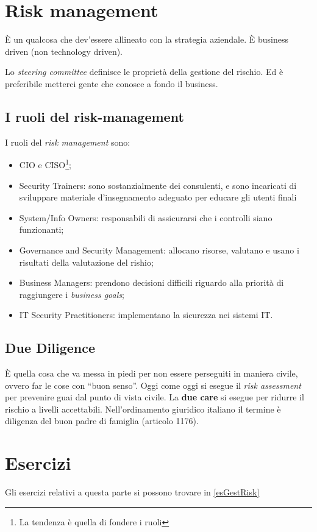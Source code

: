 \section{Risk management}

È un qualcosa che dev'essere allineato con la strategia aziendale.
È business driven (non technology driven).

Lo \textit{steering committee} definisce le proprietà della gestione del rischio.
Ed è preferibile metterci gente che conosce a fondo il business.

\subsection{I ruoli del risk-management}

I ruoli del \textit{risk management} sono:
\begin{itemize}
\item CIO e CISO\footnote{La tendenza è quella di fondere i ruoli};
\item Security Trainers: sono sostanzialmente dei consulenti, e sono incaricati
di sviluppare materiale d'insegnamento adeguato per educare gli utenti finali
\item System/Info Owners: responsabili di assicurarsi che i controlli siano
funzionanti;
\item Governance and Security Management: allocano risorse, valutano e usano i
risultati della valutazione del rishio;
\item Business Managers: prendono decisioni difficili riguardo alla priorità
di raggiungere i \textit{business goals};
\item IT Security Practitioners: implementano la sicurezza nei sistemi IT.
\end{itemize}

\subsection{Due Diligence}

È quella cosa che va messa in piedi per non essere perseguiti in maniera civile,
ovvero far le cose con ``buon senso''. Oggi come oggi si esegue il \textit{risk
assessment} per prevenire guai dal punto di vista civile. La \textbf{due care}
si esegue per ridurre il rischio a livelli accettabili. Nell'ordinamento
giuridico italiano il termine è diligenza del buon padre di famiglia (articolo
1176).


\section{Esercizi}

Gli esercizi relativi a questa parte si possono trovare in \ref{esGestRisk}
